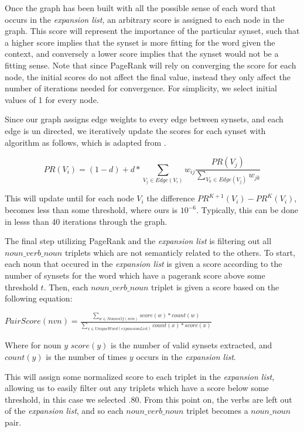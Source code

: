 \documentclass[11pt]{article}
\begin{document}
Once the graph has been built with all the possible sense of each word that
occurs in the \emph{expansion list}, an arbitrary score is assigned to each node in the
graph.  This score will represent the importance of the particular synset, such
that a higher score implies that the synset is more fitting for the word given
the context, and conversely a lower score implies that the synset would not be a
fitting sense.  Note that since PageRank will rely on converging the score for
each node, the initial scores do not affect the final value, instead they only
affect the number of iterations needed for convergence.  For simplicity, we
select initial values of 1 for every node.  

Since our graph assigns edge weights to every edge between 
synsets, and each edge is un directed, we iteratively update the scores for each
synset with algorithm as follows, which is adapted from \cite{mihalcea06randomwalks}.   

\small
\[PR(V_i) = (1-d) + d*\sum_{V_j \in Edge(V_i)} w_{ij} \frac{PR(V_j)}
   {\displaystyle\sum_{V_k \in Edge(V_j)} w_{jk}}
   \]
\normalsize

This will update until for each node \(V_i\) the difference \(PR^{K+1}(V_i)
- PR^{K}(V_i)\), becomes less than some threshold, where ours is \(10^{-6}\).
Typically, this can be done in lesss than 40 iterations through the graph.

The final step utilizing PageRank and the \emph{expansion list} is filtering out all $noun\_verb\_noun$
triplets which are not semanticly related to the others.  To start, each noun that occured
in the \emph{expansion list} is given a score according to the number of synsets
for the word which have a pagerank score above some threshold \(t\).  Then, each
  $noun\_verb\_noun$ triplet is given a score based on the following equation:

\small
$ PairScore(nvn) = \frac {\displaystyle\sum_{w \in NounsOf(nvn)} {score(w) * count(w)}}
                          {\displaystyle\sum_{x \in UniqueWord(expansionList)}
                          {count(x)} * score(x)} $ 
\normalsize

Where for noun $y$ $score(y)$ is the number of valid synsets extracted, and $count(y)$ is the
number of times $y$ occurs in the \emph{expansion list}.

This will assign some normalized score to each triplet in the \emph{expansion
list},
allowing us to easily filter out any triplets which have a score below some
threshold, in this case we selected \(.80\).  From this point on, the verbs are
left out of the \emph{expansion list}, and so each $noun\_verb\_noun$ triplet becomes a
$noun\_noun$ pair.
\end{document}
